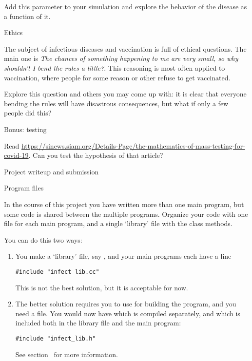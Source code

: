 Add this parameter to your simulation and explore the behavior
of the disease as a function of it.

 {Ethics}

The subject of infectious diseases and vaccination
is full of ethical questions.
The main one is \emph{The chances of something happening to me
are very small, so why shouldn't I bend the rules a little?}.
This reasoning is most often applied to vaccination,
where people for some reason or other refuse to get vaccinated.

Explore this question and others you may come up with:
it is clear that everyone bending the rules will have disastrous
consequences, but what if only a few people did this?

 {Bonus: testing}

Read \url{https://sinews.siam.org/Details-Page/the-mathematics-of-mass-testing-for-covid-19}.
Can you test the hypothesis of that article?

 {Project writeup and submission}

 {Program files}

In the course of this project you have written more than one main
program, but some code is shared between the multiple programs.
Organize your code with one file for each main program, and a single
`library' file with the class methods.

You can do this two ways:
\begin{enumerate}
\item You make a `library' file, say ,
  and your main programs each have a line
\begin{lstlisting}
#include "infect_lib.cc"
\end{lstlisting}
This is not the best solution, but it is acceptable for now.
\item The better solution requires you to use
   for building the program, and you
  need a  file.
  You would now have  which is compiled separately,
  and  which is included both in the library file and the main program:
\begin{lstlisting}
#include "infect_lib.h"
\end{lstlisting}
\begin{inbook}
  See section~ for more information.
\end{inbook}
\end{enumerate}

